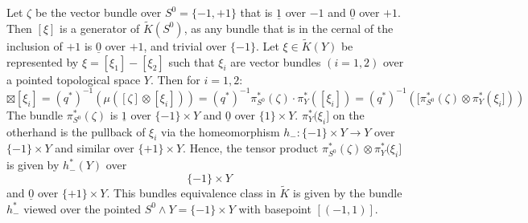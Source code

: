 \begin{remark}\label{rem:kTheo-neutralELementExternalProduct}
	Let $\zeta$ be the vector bundle  over $S^0=\{-1,+1\}$ that is $\underline{1}$ over $-1$ and $\underline{0}$ over $+1$. Then $[\xi]$ is a generator of $\tilde{K}(S^0)$, as any bundle that is in the cernal of the inclusion of $+1$ is $\underline{0}$ over $+1$, and trivial over $\{-1\}$. Let $\xi\in \tilde{K}(Y)$ be represented by $\xi=[\xi_1]-[\xi_2]$ such that $\xi_i$ are vector bundles $(i=1,2)$ over a pointed topological space $Y$. Then for $i=1,2$:
	\begin{equation*}
		[\zeta]\boxtimes [\xi_i]=(q^*)^{-1}(\mu([\zeta]\otimes [\xi_i]))=(q^*)^{-1}\pi_{S^0}^*(\zeta)\cdot \pi_Y^*([\xi_i])=(q^*)^{-1}([\pi_{S^0}^*(\zeta)\otimes  \pi_Y^*(\xi_i]))
	\end{equation*}
	The bundle $\pi_{S^0}^*(\zeta)$ is $\underline{1}$ over $\{-1\}\times Y$ and $\underline{0}$ over $\{1\}\times Y$. $\pi_Y^*(\xi_i]$ on the otherhand is the pullback of $\xi_i$ via the homeomorphism $h_-:\{- 1\}\times Y \to Y$ over $\{-1\}\times Y$ and similar over $\{+1\}\times Y$. Hence, the tensor product $\pi_{S^0}^*(\zeta)\otimes  \pi_Y^*(\xi_i]$ is given by $h_-^*(Y)$ over $$\{-1\}\times Y$$ and $\underline{0}$ over $\{+1\}\times Y$. This bundles equivalence class in $\tilde{K}$ is given by the bundle $h_-^*$ viewed over the pointed $S^0\wedge Y=\{-1\}\times Y $ with basepoint $[(-1,1)]$.
\end{remark}

